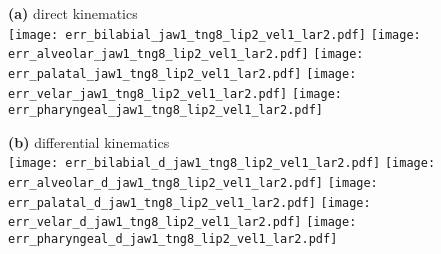 \documentclass[varwidth=7.5in]{standalone}
\begin{document}
\raggedright

{\bf (a)} direct kinematics\\
\texttt{[image: err\_bilabial\_jaw1\_tng8\_lip2\_vel1\_lar2.pdf]}%
\texttt{[image: err\_alveolar\_jaw1\_tng8\_lip2\_vel1\_lar2.pdf]}%
\texttt{[image: err\_palatal\_jaw1\_tng8\_lip2\_vel1\_lar2.pdf]}%
\texttt{[image: err\_velar\_jaw1\_tng8\_lip2\_vel1\_lar2.pdf]}%
\texttt{[image: err\_pharyngeal\_jaw1\_tng8\_lip2\_vel1\_lar2.pdf]}

{\bf (b)} differential kinematics\\
\texttt{[image: err\_bilabial\_d\_jaw1\_tng8\_lip2\_vel1\_lar2.pdf]}%
\texttt{[image: err\_alveolar\_d\_jaw1\_tng8\_lip2\_vel1\_lar2.pdf]}%
\texttt{[image: err\_palatal\_d\_jaw1\_tng8\_lip2\_vel1\_lar2.pdf]}%
\texttt{[image: err\_velar\_d\_jaw1\_tng8\_lip2\_vel1\_lar2.pdf]}%
\texttt{[image: err\_pharyngeal\_d\_jaw1\_tng8\_lip2\_vel1\_lar2.pdf]}
\end{document}
